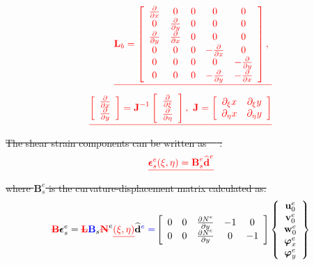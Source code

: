 \documentclass[materials,article,submit,moreauthors,pdftex]{Definitions/mdpi}
\providecommand{\DIFadd}[1]{{\protect\color{blue}{#1}}} %
\providecommand{\DIFdel}[1]{{\protect\color{red}\sout{#1}}}                      %
\providecommand{\DIFaddbegin}{} %
\providecommand{\DIFaddend}{} %
\providecommand{\DIFdelbegin}{} %
\providecommand{\DIFdelend}{} %
\begin{document}
\DIFdelbegin \begin{eqnarray*}
\DIFdel{\textbf{L}_b=\left [
\begin{array}{ccccc}
\frac{\partial }{\partial x} & 0 & 0 & 0 & 0\\
0 & \frac{\partial }{\partial y} & 0 & 0 & 0\\
\frac{\partial }{\partial y} & \frac{\partial }{\partial x} & 0 & 0 & 0\\
0 & 0 & 0 & -\frac{\partial }{\partial x} & 0\\
0 & 0 & 0 & 0 & -\frac{\partial }{\partial y}\\
0 & 0 & 0 & -\frac{\partial }{\partial y} & -\frac{\partial }{\partial x}
\end{array} \right],\ }\\
\DIFdel{\left [
\begin{array}{c}
\frac{\partial }{\partial x}\\
\frac{\partial }{\partial y}
\end{array} \right] =\textbf{J}^{-1}
\left [
\begin{array}{c}
\frac{\partial }{\partial \xi}\\
\frac{\partial }{\partial \eta}
\end{array} \right], \ 
\textbf{J}=\left [
\begin{array}{cc}
\partial_\xi x & {\partial_\xi y} \\
\partial_\eta x & {\partial_\eta y}
\end{array} \right] \nonumber
}\end{eqnarray*}%
\DIFdel{The shear strain components can be written as~\mbox{%
\cite{ferreira2008matlab}}\hspace{0pt}%
:
}\begin{eqnarray*}
\DIFdel{\boldsymbol{\epsilon}_s^e(\xi,\eta)=\textbf{B}_s^e\widehat{\textbf{d}}^e
}\end{eqnarray*}%
\DIFdel{where \(\textbf{B}_s^e\) is the curvature-displacement matrix calculated as:
}\DIFdelend \DIFaddbegin \DIFadd{The nodal shear strain-displacement relations are given in the form:
}\DIFaddend \begin{eqnarray}
\DIFdelbegin \textbf{\DIFdel{B}}%
\DIFdelend \DIFaddbegin \boldsymbol{\epsilon}\DIFaddend _s^e =
\DIFdelbegin \textbf{\DIFdel{L}}%
\DIFdelend \DIFaddbegin \textbf{\DIFadd{B}}\DIFaddend _s\DIFdelbegin \textbf{\DIFdel{N}}%
\DIFdelend ^e\DIFdelbegin \DIFdel{(\xi,\eta)
}\DIFdelend \DIFaddbegin \widehat{\textbf{d}}\DIFadd{^e = 
}\left [
\begin{array}{ccccc}
0 & 0 & \frac{\partial N^e}{\partial y} & -1 & 0\\
0 & 0 & \frac{\partial N^e}{\partial y} & 0 & -1
\end{array} \right]
\left \{ \begin{array}{c}
\textbf{u}_0^e \\
\textbf{v}_0^e \\
\textbf{w}_0^e \\
\boldsymbol{\varphi}_x^e \\
\boldsymbol{\varphi}_y^e
\end{array} \right\}
\DIFaddend \end{eqnarray}
\end{document}
